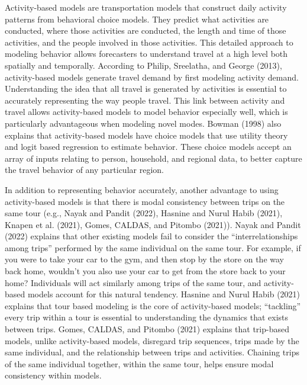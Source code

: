 \documentclass[12pt, oneside, openright]{byuthesis}
\begin{document}
Activity-based models are transportation models that construct daily activity patterns from behavioral choice models. They predict what activities are conducted, where those activities are conducted, the length and time of those activities, and the people involved in those activities. This detailed approach to modeling behavior allows forecasters to understand travel at a high level both spatially and temporally. According to Philip, Sreelatha, and George (2013), activity-based models generate travel demand by first modeling activity demand. Understanding the idea that all travel is generated by activities is essential to accurately representing the way people travel. This link between activity and travel allows activity-based models to model behavior especially well, which is particularly advantageous when modeling novel modes. Bowman (1998) also explains that activity-based models have choice models that use utility theory and logit based regression to estimate behavior. These choice models accept an array of inputs relating to person, household, and regional data, to better capture the travel behavior of any particular region.

In addition to representing behavior accurately, another advantage to using activity-based models is that there is modal consistency between trips on the same tour (e.g., Nayak and Pandit (2022), Hasnine and Nurul Habib (2021), Knapen et al. (2021), Gomes, CALDAS, and Pitombo (2021)). Nayak and Pandit (2022) explains that other existing models fail to consider the ``interrelationships among trips'' performed by the same individual on the same tour. For example, if you were to take your car to the gym, and then stop by the store on the way back home, wouldn't you also use your car to get from the store back to your home? Individuals will act similarly among trips of the same tour, and activity-based models account for this natural tendency. Hasnine and Nurul Habib (2021) explains that tour based modeling is the core of activity-based models; ``tackling'' every trip within a tour is essential to understanding the dynamics that exists between trips. Gomes, CALDAS, and Pitombo (2021) explains that trip-based models, unlike activity-based models, disregard trip sequences, trips made by the same individual, and the relationship between trips and activities. Chaining trips of the same individual together, within the same tour, helps ensure modal consistency within models.
\end{document}
